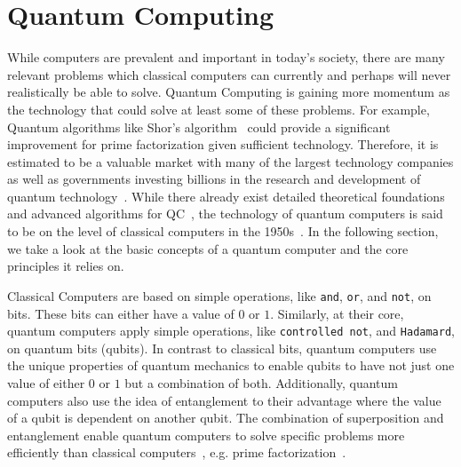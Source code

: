 \newpage
\section{Quantum Computing}
While computers are prevalent and important in today's society, there are many relevant problems which classical computers can currently and perhaps will never realistically be able to solve. Quantum Computing is gaining more momentum as the technology that could solve at least some of these problems. For example, Quantum algorithms like Shor's algorithm~\cite{Shor97} could provide a significant improvement for prime factorization given sufficient technology. Therefore, it is estimated to be a valuable market with many of the largest technology companies as well as governments investing billions in the research and development of quantum technology~\cite{RDB*22}. While there already exist detailed theoretical foundations~\cite{van20, Ying11,YYF12} and advanced algorithms for QC~\cite{ACR*10,BGB*18,LoCh19,Shor97}, the technology of quantum computers is said to be on the level of classical computers in the 1950s~\cite{CFM17}. In the following section, we take a look at the basic concepts of a quantum computer and the core principles it relies on.

Classical Computers are based on simple operations, like \texttt{and}, \texttt{or}, and \texttt{not}, on bits. These bits can either have a value of $0$ or $1$. Similarly, at their core, quantum computers apply simple operations, like \texttt{controlled not}, and \texttt{Hadamard}, on quantum bits (qubits). In contrast to classical bits, quantum computers use the unique properties of quantum mechanics to enable qubits to have not just one value of either $0$ or $1$ but a combination of both. Additionally, quantum computers also use the idea of entanglement to their advantage where the value of a qubit is dependent on another qubit. The combination of superposition and entanglement enable quantum computers to solve specific problems more efficiently than classical computers~\cite{RDB*22}, e.g. prime factorization~\cite{Shor97}.

